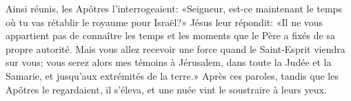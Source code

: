 Ainsi réunis, les Apôtres l’interrogeaient:
	«Seigneur, est-ce maintenant le temps
		où tu vas rétablir le royaume pour Israël?»
Jésus leur répondit: «Il ne vous appartient pas de connaître
		les temps et les moments que le Père a fixés de sa propre autorité.
Mais vous allez recevoir une force quand le Saint-Esprit viendra sur vous;
	vous serez alors mes témoins à Jérusalem,
	dans toute la Judée et la Samarie, et jusqu’aux extrémités de la terre.»
Après ces paroles, tandis que les Apôtres le regardaient,
	il s’éleva, et une nuée vint le soustraire à leurs yeux.
